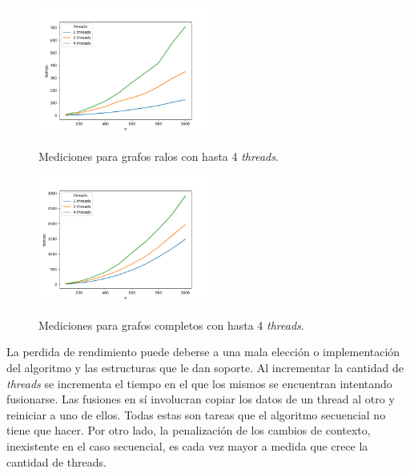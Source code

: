 \begin{figure}[h]
\caption{Mediciones para grafos ralos con hasta 4 \textit{threads}.}
\centering
\includegraphics[width=0.5\textwidth]{imagenes/ralo-124.png} \\%
\label{fig:ralos124}
\end{figure}

\begin{figure}[h]
\caption{Mediciones para grafos completos con hasta 4 \textit{threads}.}
\centering
\includegraphics[width=0.5\textwidth]{imagenes/completo-124.png} \\%
\label{fig:completos124}
\end{figure}

La perdida de rendimiento puede deberse a una mala elección o implementación
del algoritmo y las estructuras que le dan soporte. Al incrementar la 
cantidad de \textit{threads} se incrementa el tiempo en el que los mismos se
 encuentran intentando fusionarse. Las fusiones en sí involucran copiar los 
 datos de un thread al otro y reiniciar a uno de ellos. Todas estas son tareas 
 que el algoritmo secuencial no tiene que hacer. Por otro lado, la penalización
  de los cambios de contexto, inexistente en el caso secuencial, es cada vez 
  mayor a medida que crece la cantidad de threads.
